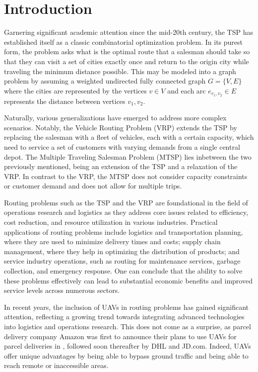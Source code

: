 \documentclass{article}
\begin{document}
	\section{Introduction}
	Garnering significant academic attention since the mid-20th century, the TSP has established itself as a classic combinatorial optimization problem. In its purest form, the problem asks what is the optimal route that a salesman should take so that they can visit a set of cities exactly once and return to the origin city while traveling the minimum distance possible. This may be modeled into a graph problem by assuming a weighted undirected fully connected graph $G=\{V,E\}$ where the cities are represented by the vertices $v\in V$ and each arc $e_{v_1,v_2}\in E$ represents the distance between vertices $v_1,v_2$.
	\par
	Naturally, various generalizations have emerged to address more complex scenarios. Notably, the Vehicle Routing Problem (VRP) extends the TSP by replacing the salesman with a fleet of vehicles, each with a certain capacity, which need to service a set of customers with varying demands from a single central depot. The Multiple Traveling Salesman Problem (MTSP) lies inbetween the two previously mentioned, being an extension of the TSP and a relaxation of the VRP. In contrast to the VRP, the MTSP does not consider capacity constraints or customer demand and does not allow for multiple trips.
	\par 
	Routing problems such as the TSP and the VRP are foundational in the field of operations research and logistics as they address core issues related to efficiency, cost reduction, and resource utilization in various industries.
	Practical applications of routing problems include logistics and transportation planning, where they are used to minimize delivery times and costs; supply chain management, where they help in optimizing the distribution of products; and service industry operations, such as routing for maintenance services, garbage collection, and emergency response. One can conclude that the ability to solve these problems effectively can lead to substantial economic benefits and improved service levels across numerous sectors.
	\par 
	In recent years, the inclusion of UAVs in routing problems has gained significant attention, reflecting a growing trend towards integrating advanced technologies into logistics and operations research. This does not come as a surprise, as parcel delivery company Amazon \cite{rose2013} was first to announce their plans to use UAVs for parcel deliveries in \citeyear{rose2013}, followed soon thereafter by DHL and JD.com. Indeed, UAVs offer unique advantages by being able to bypass ground traffic and being able to reach remote or inaccessible areas.
\end{document}
